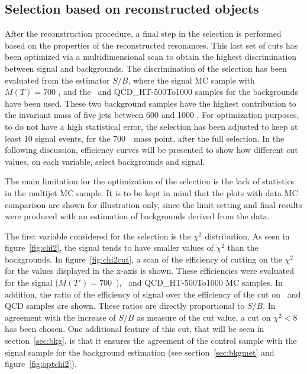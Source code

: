 \subsection{Selection based on reconstructed objects}
\label{sec:finalsel}

After the reconstruction procedure, a final step in the selection is performed based on the properties of the reconstructed resonances. This last set of cuts has been optimized via a multidimensional scan to obtain the highest discrimination between signal and backgrounds. The discrimination of the selection has been evaluated from the estimator $S/B$, where the signal MC sample with $M(T)=700$ \GeVcc, and the \ttbar~and QCD\_HT-500To1000 samples for the backgrounds have been used. These two background samples have the highest contribution to the invariant mass of five jets between 600 and 1000 \GeVcc. For optimization purposes, to do not have a high statistical error, the selection has been adjusted to keep at least 10 signal events, for the 700~\GeVcc~mass point, after the full selection. In the following discussion, efficiency curves will be presented to show how different cut values, on each variable, select backgrounds and signal. 

The main limitation for the optimization of the selection is the lack of statistics in the multijet MC sample. It is to be kept in mind that the plots with data MC comparison are shown for illustration only, since the limit setting and final results were produced with an estimation of backgrounds derived from the data.

The first variable considered for the selection is the $\chi^{2}$ distribution. As seen in figure~\ref{fig:chi2}, the signal tends to have smaller values of $\chi^{2}$ than the backgrounds. In figure~\ref{fig:chi2cut}, a scan of the efficiency of cutting on the $\chi^{2}$ for the values displayed in the x-axis is shown. These efficiencies were evaluated for the signal (${M(T')=700}$~\GeVcc), \ttbar~and QCD\_HT-500To1000 MC samples. In addition, the ratio of the efficiency of signal over the efficiency of the cut on \ttbar~and QCD samples are shown. These ratios are directly proportional to $S/B$. In agreement with the increase of $S/B$ as measure of the cut value, a cut on $\chi^{2}<8$ has been chosen. One additional feature of this cut, that will be seen in section~\ref{sec:bkg}, is that it ensures the agreement of the control sample with the signal sample for the background estimation (see section~\ref{sec:bkgmet} and figure~\ref{fig:optchi2}).

